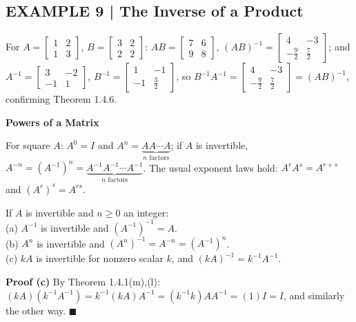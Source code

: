\documentclass{article}
\newcommand{\redheading}[1]{{\vspace{2mm}\noindent\Large\bfseries\color{red!55!black} #1\par}\vspace{2mm}}
\theoremstyle{mystyle}
\begin{document}
\subsection*{EXAMPLE 9 | The Inverse of a Product}
For $A=\begin{bmatrix}1&2\\1&3\end{bmatrix}$, $B=\begin{bmatrix}3&2\\2&2\end{bmatrix}$: $AB=\begin{bmatrix}7&6\\9&8\end{bmatrix}$, $(AB)^{-1}=\begin{bmatrix}4&-3\\-\tfrac92&\tfrac72\end{bmatrix}$; and $A^{-1}=\begin{bmatrix}3&-2\\-1&1\end{bmatrix}$, $B^{-1}=\begin{bmatrix}1&-1\\-1&\tfrac32\end{bmatrix}$, so $B^{-1}A^{-1}=\begin{bmatrix}4&-3\\-\tfrac92&\tfrac72\end{bmatrix}=(AB)^{-1}$, confirming Theorem 1.4.6.

\redheading{Powers of a Matrix}

For square $A$: $A^0=I$ and $A^n=\underbrace{AA\cdots A}_{n\text{ factors}}$; if $A$ is invertible, $A^{-n}=(A^{-1})^n=\underbrace{A^{-1}A^{-1}\cdots A^{-1}}_{n\text{ factors}}$. The usual exponent laws hold: $A^rA^s=A^{r+s}$ and $(A^r)^s=A^{rs}$.

\begin{tcolorbox}[colback=red!4, colframe=red!60!black, title=Theorem 1.4.7, boxrule=0.5mm, arc=3mm]
If $A$ is invertible and $n\ge0$ an integer:\\
(a) $A^{-1}$ is invertible and $(A^{-1})^{-1}=A$.\\
(b) $A^n$ is invertible and $(A^n)^{-1}=A^{-n}=(A^{-1})^n$.\\
(c) $kA$ is invertible for nonzero scalar $k$, and $(kA)^{-1}=k^{-1}A^{-1}$.
\end{tcolorbox}
\textbf{Proof (c)} By Theorem 1.4.1(m),(l): $(kA)(k^{-1}A^{-1})=k^{-1}(kA)A^{-1}=(k^{-1}k)AA^{-1}=(1)I=I$, and similarly the other way. $\blacksquare$
\end{document}
